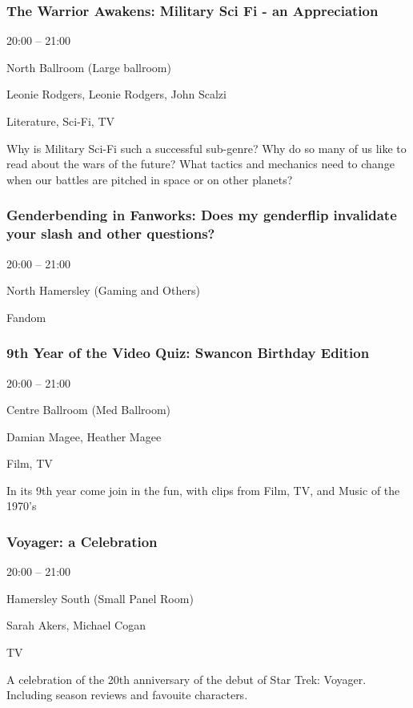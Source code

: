 \documentclass{scrreprt}
\begin{document}
\begin{multicols}{2}
\subsubsection*{The Warrior Awakens: Military Sci Fi - an Appreciation}\begin{description}
\setlength{\itemsep}{0pt}
\setlength{\parsep}{0pt}
\setlength{\parskip}{0pt}
\item[Time:]{20:00 -- 21:00}
\item[Venue:]{North Ballroom (Large ballroom)}
\item[People:]{Leonie Rodgers, Leonie Rodgers, John Scalzi}
\item[Tags:]{Literature, Sci-Fi, TV}\end{description}
Why is Military Sci-Fi such a successful sub-genre? Why do so many of us like to read about the wars of the future? What tactics and mechanics need to change when our battles are pitched in space or on other planets?
\subsubsection*{Genderbending in Fanworks: Does my genderflip invalidate your slash and other questions?}\begin{description}
\setlength{\itemsep}{0pt}
\setlength{\parsep}{0pt}
\setlength{\parskip}{0pt}
\item[Time:]{20:00 -- 21:00}
\item[Venue:]{North Hamersley (Gaming and Others)}
\item[Tags:]{Fandom}\end{description}

\subsubsection*{9th Year of the Video Quiz: Swancon Birthday Edition}\begin{description}
\setlength{\itemsep}{0pt}
\setlength{\parsep}{0pt}
\setlength{\parskip}{0pt}
\item[Time:]{20:00 -- 21:00}
\item[Venue:]{Centre Ballroom (Med Ballroom)}
\item[People:]{Damian Magee, Heather Magee}
\item[Tags:]{Film, TV}\end{description}
In its 9th year come join in the fun, with clips from Film, TV, and Music of the 1970’s
\subsubsection*{Voyager: a Celebration}\begin{description}
\setlength{\itemsep}{0pt}
\setlength{\parsep}{0pt}
\setlength{\parskip}{0pt}
\item[Time:]{20:00 -- 21:00}
\item[Venue:]{Hamersley South (Small Panel Room)}
\item[People:]{Sarah Akers, Michael Cogan}
\item[Tags:]{TV}\end{description}
A celebration of the 20th anniversary of the debut of Star Trek: Voyager. Including season reviews and favouite characters.

\end{multicols}
\end{document}
